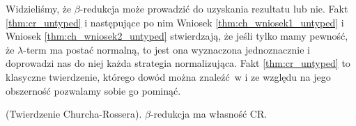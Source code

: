 Widzieliśmy, że \(\beta\)-redukcja może prowadzić do uzyskania rezultatu lub nie. Fakt \ref{thm:cr_untyped} i następujące po nim Wniosek \ref{thm:ch_wniosek1_untyped} i Wniosek \ref{thm:ch_wniosek2_untyped} stwierdzają, że jeśli tylko mamy pewność, że \(\lambda\)-term ma postać normalną, to jest ona wyznaczona jednoznacznie i doprowadzi nas do niej każda strategia normalizująca. Fakt \ref{thm:cr_untyped} to klasyczne twierdzenie, którego dowód można znaleźć w \cite[Rozdział 3.2]{Barendregt_1984} i ze względu na jego obszerność pozwalamy sobie go pominąć. 

\begin{fakt}(Twierdzenie Churcha-Rossera)\label{thm:cr_untyped}. 
\(\beta\)-redukcja ma własność CR. 
\end{fakt}

